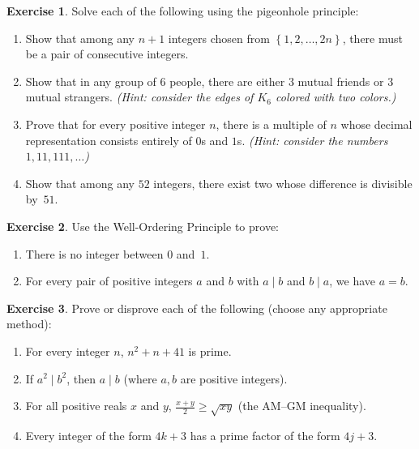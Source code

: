 \documentclass[12pt,a4paper,openany]{book}
\theoremstyle{definition}
\newtheorem{exercise}{Exercise}[chapter]
\theoremstyle{plain}
\theoremstyle{remark}
\newcommand{\set}[1]{\left\{#1\right\}}
\begin{document}
\begin{exercise}
\label{exer:pigeonhole-exercises}
Solve each of the following using the pigeonhole principle:
\begin{enumerate}[label=(\alph*),nosep]
  \item Show that among any $n+1$ integers chosen from $\set{1, 2, \dots, 2n}$,
        there must be a pair of consecutive integers.
  \item Show that in any group of $6$ people, there are either $3$ mutual friends or
        $3$ mutual strangers. \emph{(Hint: consider the edges of $K_6$ colored with
        two colors.)}
  \item Prove that for every positive integer $n$, there is a multiple of $n$ whose
        decimal representation consists entirely of $0$s and $1$s.
        \emph{(Hint: consider the numbers $1, 11, 111, \dots$)}
  \item Show that among any $52$ integers, there exist two whose difference is
        divisible by~$51$.
\end{enumerate}
\end{exercise}

\begin{exercise}
\label{exer:well-ordering-exercises}
Use the Well-Ordering Principle to prove:
\begin{enumerate}[label=(\alph*),nosep]
  \item There is no integer between $0$ and~$1$.
  \item For every pair of positive integers $a$ and $b$ with $a \mid b$ and
        $b \mid a$, we have $a = b$.
\end{enumerate}
\end{exercise}

\begin{exercise}
\label{exer:mixed-proofs}
Prove or disprove each of the following (choose any appropriate method):
\begin{enumerate}[label=(\alph*),nosep]
  \item For every integer $n$, $n^2 + n + 41$ is prime.
  \item If $a^2 \mid b^2$, then $a \mid b$ (where $a, b$ are positive integers).
  \item For all positive reals $x$ and $y$, $\frac{x + y}{2} \geq \sqrt{xy}$
        (the AM--GM inequality).
  \item Every integer of the form $4k + 3$ has a prime factor of the form $4j + 3$.
\end{enumerate}
\end{exercise}
\end{document}
